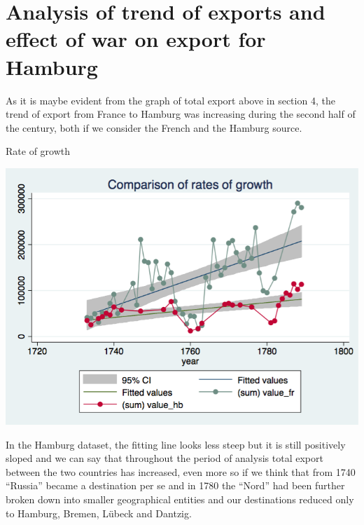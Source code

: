 \documentclass[12pt,a4paper,titlepage]{article}
\begin{document}
\section{Analysis of trend of exports and effect of war on export for Hamburg}
As it is maybe evident from the graph of total export above in section 4, the trend of export from France to Hamburg was increasing during the second half of the century, both if we consider the French and the Hamburg source.
\begin{center}
\caption{Rate of growth}
\includegraphics[scale=.3]{growth.png}
\end{center}
In the Hamburg dataset, the fitting line looks less steep but it is still positively sloped and we can say that throughout the period of analysis total export between the two countries has increased, even more so if we think that from 1740 “Russia” became a destination per se and in 1780 the “Nord” had been further broken down into smaller geographical entities and our destinations reduced only to Hamburg, Bremen, Lübeck and Dantzig. \\
\end{document}
